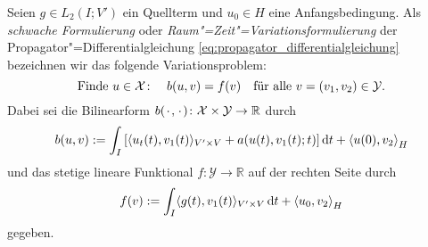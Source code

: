 \begin{Definition}
\label{definition:raum_zeit_variationsformulierung}
    Seien $g \in L_{2}(I; V')$ ein Quellterm und $u_{0} \in H$ eine Anfangsbedingung.
    Als \emph{schwache Formulierung} oder \emph{Raum"=Zeit"=Variationsformulierung} der Propagator"=Differentialgleichung \cref{eq:propagator_differentialgleichung} bezeichnen wir das folgende Variationsproblem:
    \begin{equation}
    \label{eq:raum_zeit_variationsformulierung}
        \text{Finde}~u \in \mathcal X \colon \quad  b(u, v) = f(v) \quad \fa v = (v_{1}, v_{2}) \in \mathcal Y.
    \end{equation}
    Dabei sei die Bilinearform $b({\mkern2mu\cdot\mkern2mu}, {\mkern2mu\cdot\mkern2mu}) \colon \mathcal X \times \mathcal Y \to \mathbb{R}$ durch
    \begin{equation}
        \label{eq:raum_zeit_variationsformulierung:lhs}
        b(u, v)
            := \int_{I} \left[ \skp{u_{t}(t)}{v_{1}(t)}{V' \times V} + a(u(t), v_{1}(t); t) \right]  \diff t + \skprod{u(0)}{v_{2}}_{H}
    \end{equation}
    und das stetige lineare Funktional $f \colon \mathcal Y \to \mathbb{R}$ auf der rechten Seite durch
    \begin{equation}
        \label{eq:raum_zeit_variationsformulierung:rhs}
        f(v) := \int_{I} \skp{g(t)}{v_{1}(t)}{V' \times V} \diff t + \skprod{u_{0}}{v_{2}}_{H}
    \end{equation}
    gegeben.
\end{Definition}

